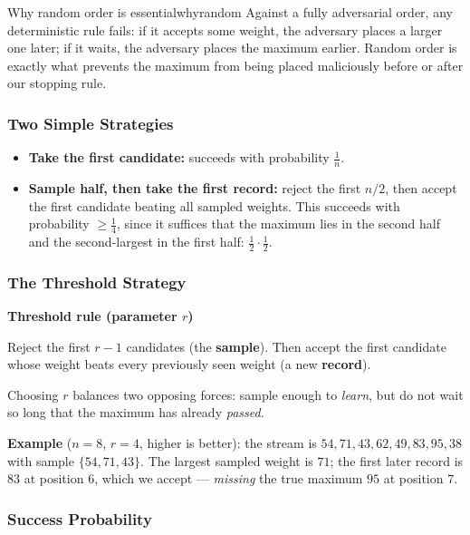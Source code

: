\begin{remark}{Why random order is essential}{whyrandom}
Against a fully adversarial order, any deterministic rule fails: if it accepts some weight, the adversary places a larger one later; if it waits, the adversary places the maximum earlier. Random order is exactly what prevents the maximum from being placed maliciously before or after our stopping rule.
\end{remark}

\subsubsection{Two Simple Strategies}

\begin{itemize}
  \item \textbf{Take the first candidate:} succeeds with probability $\tfrac1n$.
  \item \textbf{Sample half, then take the first record:} reject the first $n/2$, then accept the first candidate beating all sampled weights. This succeeds with probability $\ge \tfrac14$, since it suffices that the maximum lies in the second half and the second-largest in the first half: $\tfrac12 \cdot \tfrac12$.
\end{itemize}

\subsubsection{The Threshold Strategy}

\begin{mdframed}[backgroundcolor=lightblue, linecolor=keyblue, linewidth=1pt]
\textbf{Threshold rule (parameter $r$)}

Reject the first $r - 1$ candidates (the \textbf{sample}). Then accept the first candidate whose weight beats every previously seen weight (a new \textbf{record}).
\end{mdframed}

Choosing $r$ balances two opposing forces: sample enough to \emph{learn}, but do not wait so long that the maximum has already \emph{passed}.

\textbf{Example} ($n = 8$, $r = 4$, higher is better): the stream is $54, 71, 43, 62, 49, 83, 95, 38$ with sample $\{54, 71, 43\}$. The largest sampled weight is $71$; the first later record is $83$ at position $6$, which we accept --- \emph{missing} the true maximum $95$ at position $7$.

\subsubsection{Success Probability}

